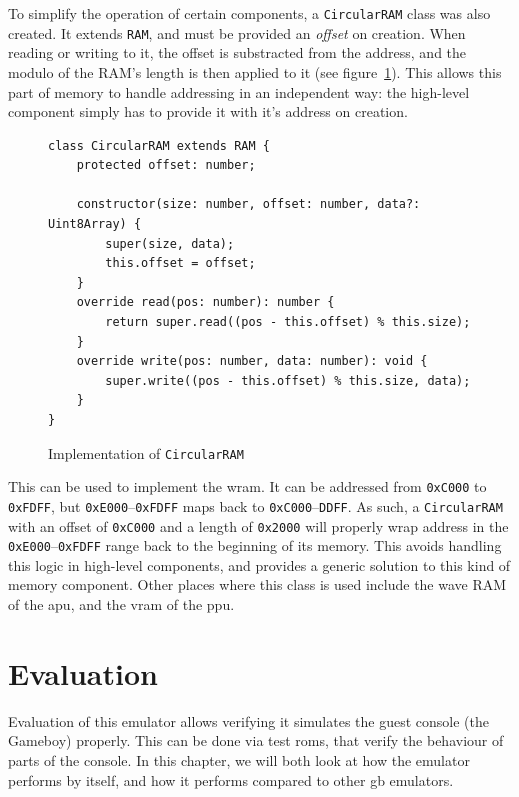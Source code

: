 \documentclass[11pt]{report}
\begin{document}
To simplify the operation of certain components, a \texttt{CircularRAM} class was also created. It extends \texttt{RAM}, and must be provided an \textit{offset} on creation. When reading or writing to it, the offset is substracted from the address, and the modulo of the RAM's length is then applied to it (see figure~\ref{fig:circular-ram}). This allows this part of memory to handle addressing in an independent way: the high-level component simply has to provide it with it's address on creation.

\begin{figure}[h]
    \begin{verbatim}
class CircularRAM extends RAM {
    protected offset: number;

    constructor(size: number, offset: number, data?: Uint8Array) {
        super(size, data);
        this.offset = offset;
    }
    override read(pos: number): number {
        return super.read((pos - this.offset) % this.size);
    }
    override write(pos: number, data: number): void {
        super.write((pos - this.offset) % this.size, data);
    }
}
    \end{verbatim}
    \caption{Implementation of \texttt{CircularRAM}}
    \label{fig:circular-ram}
\end{figure}

This can be used to implement the \gls{wram}. It can be addressed from \texttt{0xC000} to \texttt{0xFDFF}, but \texttt{0xE000}--\texttt{0xFDFF} maps back to \texttt{0xC000}--\texttt{DDFF}. As such, a \texttt{CircularRAM} with an offset of \texttt{0xC000} and a length of \texttt{0x2000} will properly wrap address in the \texttt{0xE000}--\texttt{0xFDFF} range back to the beginning of its memory. This avoids handling this logic in high-level components, and provides a generic solution to this kind of memory component. Other places where this class is used include the wave RAM of the \gls{apu}, and the \gls{vram} of the \gls{ppu}.

\chapter{Evaluation}

Evaluation of this emulator allows verifying it simulates the guest console (the Gameboy) properly. This can be done via test \glspl{rom}, that verify the behaviour of parts of the console. In this chapter, we will both look at how the emulator performs by itself, and how it performs compared to other \gls{gb} emulators.
\end{document}
